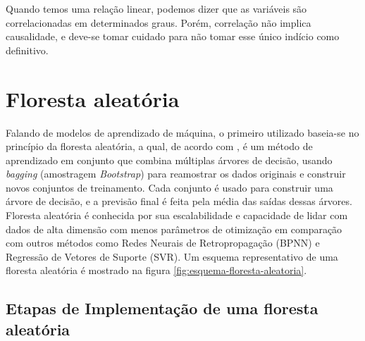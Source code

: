 Quando temos uma relação linear, podemos dizer que as variáveis são correlacionadas em determinados graus. Porém, correlação não implica causalidade, e deve-se tomar cuidado para não tomar esse único indício como definitivo.

\pagebreak


\section{Floresta aleatória}

Falando de modelos de aprendizado de máquina, o primeiro utilizado baseia-se no princípio da floresta aleatória, a qual, de acordo com \cite{Wang2023}, é um método de aprendizado em conjunto que combina múltiplas árvores de decisão, usando \textit{bagging} (amostragem \textit{Bootstrap}) para reamostrar os dados originais e construir novos conjuntos de treinamento. Cada conjunto é usado para construir uma árvore de decisão, e a previsão final é feita pela média das saídas dessas árvores. Floresta aleatória é conhecida por sua escalabilidade e capacidade de lidar com dados de alta dimensão com menos parâmetros de otimização em comparação com outros métodos como Redes Neurais de Retropropagação (BPNN) e Regressão de Vetores de Suporte (SVR). Um esquema representativo de uma floresta aleatória é mostrado na figura \ref{fig:esquema-floresta-aleatoria}.

  	\begin{figure}[h!] 
   	    \captionsetup{width=12cm}%
	\end{figure}

 \subsection{Etapas de Implementação de uma floresta aleatória}


